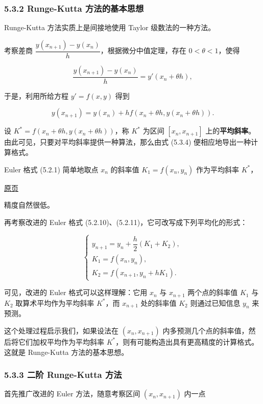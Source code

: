 \documentclass[
  10pt,
  fontset=fandol]{ctexart}
\begin{document}
\subsubsection{5.3.2 Runge-Kutta 方法的基本思想}\label{runge-kutta-ux65b9ux6cd5ux7684ux57faux672cux601dux60f3}

Runge-Kutta 方法实质上是间接地使用 Taylor 级数法的一种方法。

考察差商 \(\dfrac{y(x_{n+1})-y(x_n)}{h}\)，根据微分中值定理，存在 \(0<\theta<1\)，使得

\[
\frac{y(x_{n+1})-y(x_n)}{h}=y'(x_n+\theta h),
\]

于是，利用所给方程 \(y'=f(x,y)\) 得到

\[
y(x_{n+1})=y(x_n)+hf(x_n+\theta h,y(x_n+\theta h)).\tag{5.3.4}
\]

设 \(K^*=f(x_n+\theta h,y(x_n+\theta h))\)，称 \(K^*\) 为区间 \([x_n,x_{n+1}]\) 上的\textbf{平均斜率}。由此可见，只要对平均斜率提供一种算法，那么由式 (5.3.4) 便相应地导出一种计算格式。

Euler 格式 (5.2.1) 简单地取点 \(x_n\) 的斜率值 \(K_1=f(x_n,y_n)\) 作为平均斜率 \(K^*\)，

\href{../../source-images/pdf-128.jpeg}{原页}

精度自然很低。

再考察改进的 Euler 格式 (5.2.10)、(5.2.11)，它可改写成下列平均化的形式：

\[
\begin{cases}
y_{n+1}=y_n+\dfrac{h}{2}(K_1+K_2),\\
K_1=f(x_n,y_n),\\
K_2=f(x_{n+1},y_n+hK_1).
\end{cases}
\]

可见，改进的 Euler 格式可以这样理解：它用 \(x_n\) 与 \(x_{n+1}\) 两个点的斜率值 \(K_1\) 与 \(K_2\) 取算术平均作为平均斜率 \(K^*\)，而 \(x_{n+1}\) 处的斜率值 \(K_2\) 则通过已知信息 \(y_n\) 来预测。

这个处理过程启示我们，如果设法在 \((x_n,x_{n+1})\) 内多预测几个点的斜率值，然后将它们加权平均作为平均斜率 \(K^*\)，则有可能构造出具有更高精度的计算格式。这就是 Runge-Kutta 方法的基本思想。

\subsubsection{5.3.3 二阶 Runge-Kutta 方法}\label{ux4e8cux9636-runge-kutta-ux65b9ux6cd5}

首先推广改进的 Euler 方法，随意考察区间 \((x_n,x_{n+1})\) 内一点
\end{document}
